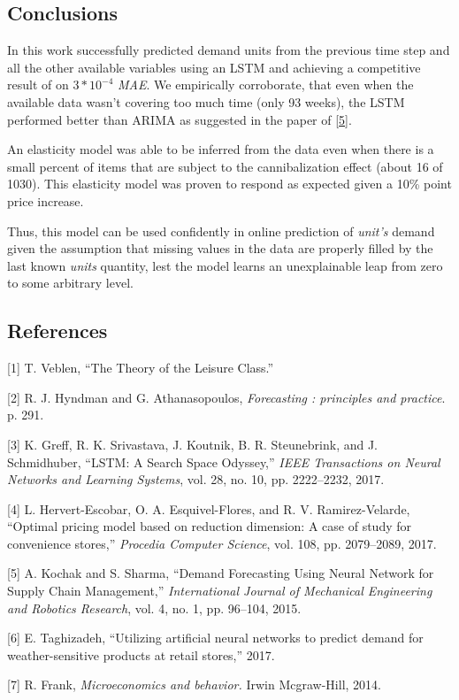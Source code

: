 \documentclass[]{article}
\theoremstyle{definition}
\theoremstyle{definition}
\theoremstyle{definition}
\theoremstyle{remark}
\begin{document}
\subsection{Conclusions}\label{conclusions}

In this work successfully predicted demand units from the previous time
step and all the other available variables using an LSTM and achieving a
competitive result of on \(3*10^{-4}\) \emph{MAE}. We empirically
corroborate, that even when the available data wasn't covering too much
time (only 93 weeks), the LSTM performed better than ARIMA as suggested
in the paper of {[}\protect\hyperlink{ref-Kochak2015}{5}{]}.

An elasticity model was able to be inferred from the data even when
there is a small percent of items that are subject to the
cannibalization effect (about 16 of 1030). This elasticity model was
proven to respond as expected given a 10\% point price increase.

Thus, this model can be used confidently in online prediction of
\emph{unit's} demand given the assumption that missing values in the
data are properly filled by the last known \emph{units} quantity, lest
the model learns an unexplainable leap from zero to some arbitrary
level.

\subsection*{References}\label{references}

\hypertarget{refs}{}
\hypertarget{ref-Veblen}{}
{[}1{]} T. Veblen, ``The Theory of the Leisure Class.''

\hypertarget{ref-Hyndman}{}
{[}2{]} R. J. Hyndman and G. Athanasopoulos, \emph{Forecasting :
principles and practice}. p. 291.

\hypertarget{ref-Greff2017}{}
{[}3{]} K. Greff, R. K. Srivastava, J. Koutnik, B. R. Steunebrink, and
J. Schmidhuber, ``LSTM: A Search Space Odyssey,'' \emph{IEEE
Transactions on Neural Networks and Learning Systems}, vol. 28, no. 10,
pp. 2222--2232, 2017.

\hypertarget{ref-Hervert-Escobar2017}{}
{[}4{]} L. Hervert-Escobar, O. A. Esquivel-Flores, and R. V.
Ramirez-Velarde, ``Optimal pricing model based on reduction dimension: A
case of study for convenience stores,'' \emph{Procedia Computer
Science}, vol. 108, pp. 2079--2089, 2017.

\hypertarget{ref-Kochak2015}{}
{[}5{]} A. Kochak and S. Sharma, ``Demand Forecasting Using Neural
Network for Supply Chain Management,'' \emph{International Journal of
Mechanical Engineering and Robotics Research}, vol. 4, no. 1, pp.
96--104, 2015.

\hypertarget{ref-Taghizadeh2017}{}
{[}6{]} E. Taghizadeh, ``Utilizing artificial neural networks to predict
demand for weather-sensitive products at retail stores,'' 2017.

\hypertarget{ref-Frank2014}{}
{[}7{]} R. Frank, \emph{Microeconomics and behavior.} Irwin Mcgraw-Hill,
2014.
\end{document}
